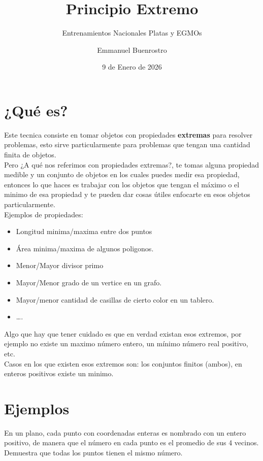 \documentclass[11pt]{scrartcl}
\title {Principio Extremo}
\subtitle {Entrenamientos Nacionales Platas y EGMOs}
\author{Emmanuel Buenrostro}
\date{9 de Enero de 2026}
\begin{document}
\maketitle

\section{¿Qué es?}
Este tecnica consiste en tomar objetos con propiedades \textbf{extremas} para resolver problemas, esto sirve particularmente 
para problemas que tengan una cantidad finita de objetos. \\


Pero ¿A qué nos referimos con propiedades extremas?, te tomas alguna propiedad medible y un conjunto de objetos en los cuales puedes medir esa propiedad, entonces 
lo que haces es trabajar con los objetos que tengan el máximo o el minimo de esa propiedad y te pueden dar cosas útiles enfocarte en esos objetos particularmente.  \\

Ejemplos de propiedades: 

\begin{itemize}
    \item Longitud minima/maxima entre dos puntos
    \item Área minima/maxima de algunos poligonos.
    \item Menor/Mayor divisor primo
    \item Mayor/Menor grado de un vertice en un grafo.
    \item Mayor/menor cantidad de casillas de cierto color en un tablero.
    \item \ldots.
\end{itemize}


Algo que hay que tener cuidado es que en verdad existan esos extremos, por ejemplo no existe un maximo número entero, un mínimo número real positivo, etc.  \\
Casos en los que existen esos extremos son:  los conjuntos finitos (ambos), en enteros positivos existe un minimo.

\section{Ejemplos}

\begin{example} 
    En un plano, cada punto con coordenadas enteras es nombrado con un entero positivo, de manera que el número en cada punto es el promedio de sus 4 vecinos. Demuestra que todas los puntos tienen el mismo número.
\end{example}
\end{document}
